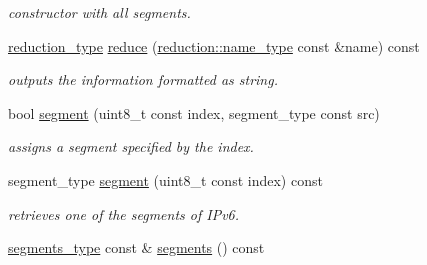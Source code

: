 \begin{DoxyCompactItemize}
\begin{DoxyCompactList}\small\item\em constructor with all segments. \end{DoxyCompactList}\item 
\hypertarget{classhryky_1_1ip_1_1v6_1_1_entity_a73baa386b3470c8cb717bf9f985524ad}{\hyperlink{namespacehryky_a343a9a4c36a586be5c2693156200eadc}{reduction\-\_\-type} \hyperlink{classhryky_1_1ip_1_1v6_1_1_entity_a73baa386b3470c8cb717bf9f985524ad}{reduce} (\hyperlink{namespacehryky_1_1reduction_ac686c30a4c8d196bbd0f05629a6b921f}{reduction\-::name\-\_\-type} const \&name) const }\label{classhryky_1_1ip_1_1v6_1_1_entity_a73baa386b3470c8cb717bf9f985524ad}

\begin{DoxyCompactList}\small\item\em outputs the information formatted as string. \end{DoxyCompactList}\item 
\hypertarget{classhryky_1_1ip_1_1v6_1_1_entity_ad2799b59be0de2b40246515c1fc299f9}{bool \hyperlink{classhryky_1_1ip_1_1v6_1_1_entity_ad2799b59be0de2b40246515c1fc299f9}{segment} (uint8\-\_\-t const index, segment\-\_\-type const src)}\label{classhryky_1_1ip_1_1v6_1_1_entity_ad2799b59be0de2b40246515c1fc299f9}

\begin{DoxyCompactList}\small\item\em assigns a segment specified by the index. \end{DoxyCompactList}\item 
\hypertarget{classhryky_1_1ip_1_1v6_1_1_entity_ac84b9274d450f58bd355e6dc480a4457}{segment\-\_\-type \hyperlink{classhryky_1_1ip_1_1v6_1_1_entity_ac84b9274d450f58bd355e6dc480a4457}{segment} (uint8\-\_\-t const index) const }\label{classhryky_1_1ip_1_1v6_1_1_entity_ac84b9274d450f58bd355e6dc480a4457}

\begin{DoxyCompactList}\small\item\em retrieves one of the segments of I\-Pv6. \end{DoxyCompactList}\item 
\hypertarget{classhryky_1_1ip_1_1v6_1_1_entity_a70ed1a8a190b4be7f989ba47afe5ffad}{\hyperlink{classhryky_1_1_array}{segments\-\_\-type} const \& \hyperlink{classhryky_1_1ip_1_1v6_1_1_entity_a70ed1a8a190b4be7f989ba47afe5ffad}{segments} () const }\label{classhryky_1_1ip_1_1v6_1_1_entity_a70ed1a8a190b4be7f989ba47afe5ffad}


\end{DoxyCompactItemize}

